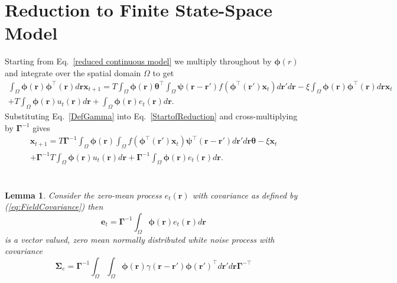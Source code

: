 \documentclass[12pt]{iopart}		%
\begin{document}
\section{Reduction to Finite State-Space Model}\label{Simplifying Decomposition}
Starting from Eq.~\ref{reduced continuous model} we multiply throughout by $\boldsymbol{\phi}(r)$ and integrate over the spatial domain $\Omega$ to get
\begin{eqnarray}\label{StartofReduction}
	\int_\Omega  {\boldsymbol{\phi} \left(\mathbf{r}\right)\boldsymbol{\phi}^{\top}\left(\mathbf{r}\right) d\mathbf{r}} \mathbf{x}_{t+1} = T \int_\Omega  {\boldsymbol{\phi} (\mathbf{r}) \boldsymbol{\theta}^{\top} \int_\Omega  {\boldsymbol{\psi}  \left(\mathbf{r}-\mathbf{r}'\right) f\left(\boldsymbol{\phi}^{\top}\left(\mathbf{r}'\right) \mathbf{x}_t \right)d\mathbf{r}'}d\mathbf{r}} - \xi\int_\Omega {\boldsymbol{\phi}(\mathbf{r})\boldsymbol{\phi}^{\top}(\mathbf{r})d\mathbf{r}} \mathbf{x}_t \\
	+ T \int_\Omega{\boldsymbol{\phi} \left(\mathbf{r}\right) u_t\left(\mathbf{r}\right)d\mathbf{r}} + \int_\Omega{\boldsymbol{\phi} \left(\mathbf{r}\right) e_t\left(\mathbf{r}\right)d\mathbf{r}}.
\end{eqnarray}
Substituting Eq.~\ref{DefGamma} into Eq.~\ref{StartofReduction} and cross-multiplying by $\boldsymbol{\Gamma}^{-1}$ gives 
\begin{eqnarray}\label{Homogeneous SS Model}
	\mathbf{x}_{t+1} = T\boldsymbol{\Gamma}^{ - 1}\int_\Omega {\boldsymbol{\phi}\left(\mathbf{r}\right) \int_\Omega {f\left(\boldsymbol{\phi}^{\top}\left(\mathbf{r}'\right)\mathbf{x}_t\right) \boldsymbol{\psi}^{\top} \left(\mathbf{r}-\mathbf{r}'\right)d\mathbf{r}'} d\mathbf{r}} \boldsymbol{\theta} - \xi \mathbf{x}_t \\
	+ \boldsymbol{\Gamma}^{-1}T \int_\Omega{\boldsymbol{\phi} \left(\mathbf{r}\right) u_t\left(\mathbf{r}\right)d\mathbf{r}} + \boldsymbol{\Gamma}^{-1} \int_\Omega{\boldsymbol{\phi}\left(\mathbf{r}\right)e_t\left(\mathbf{r}\right)d\mathbf{r}}.
\end{eqnarray}
\section{}\label{ColoredNoise}
\newtheorem{lemma}{Lemma}
\begin{lemma}
Consider the zero-mean process $e_t\left(\mathbf r\right)$ with covariance as defined by (\ref{eq:FieldCovariance}) then
\begin{equation}
 \mathbf e_t=\boldsymbol{\Gamma}^{-1}\int_\Omega  {\boldsymbol{\phi} ( \mathbf{r} )e_t( \mathbf{r} )d\mathbf{r}}
\label{eq:AppendixWt}
\end{equation}
is a vector valued, zero mean normally distributed white noise process with covariance
\begin{equation}
\boldsymbol\Sigma_e =\mathbf{\Gamma}^{-1}\int_{\Omega}\int_{\Omega}\boldsymbol{\phi}\left(\mathbf r\right) \gamma\left(\mathbf r- \mathbf r' \right)\boldsymbol{\phi}\left(\mathbf r'\right)^{\top}d\mathbf r' d\mathbf r\mathbf{\Gamma}^{- \top} 
\end{equation}
\label{lemma:FieldCovariance}
\end{lemma}
\end{document}

